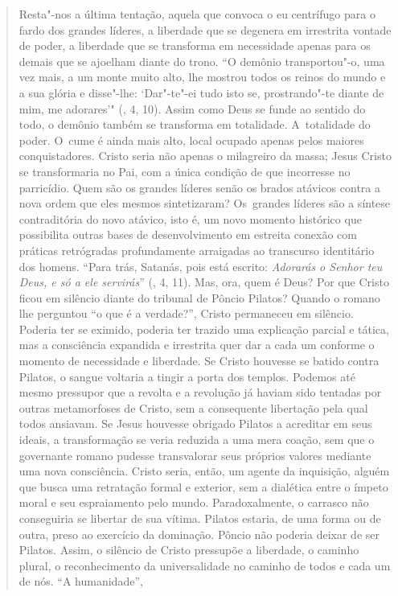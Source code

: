 {\begin{quote}
Resta"-nos a última tentação, aquela que convoca o eu centrífugo para o
fardo dos grandes líderes, a liberdade que se degenera em irrestrita
vontade de poder, a liberdade que se transforma em necessidade apenas
para os demais que se ajoelham diante do trono. ``O demônio
transportou"-o, uma vez mais, a um monte muito alto, lhe mostrou todos os
reinos do mundo e a sua glória e disse"-lhe: `Dar"-te"-ei tudo isto se,
prostrando"-te diante de mim, me adorares'" (, 4, 10). Assim como
Deus se funde ao sentido do todo, o demônio também se transforma em
totalidade. A~totalidade do poder. O~cume é ainda mais alto, local
ocupado apenas pelos maiores conquistadores. Cristo seria não apenas o
milagreiro da massa; Jesus Cristo se transformaria no Pai, com a única
condição de que incorresse no parricídio. Quem são os grandes líderes
senão os brados atávicos contra a nova ordem que eles mesmos
sintetizaram? Os~grandes líderes são a síntese contraditória do novo
atávico, isto é, um novo momento histórico que possibilita outras bases
de desenvolvimento em estreita conexão com práticas retrógradas
profundamente arraigadas ao transcurso identitário dos homens. ``Para
trás, Satanás, pois está escrito: \emph{Adorarás o Senhor teu Deus, e só
a ele servirás}'' (, 4, 11). Mas, ora, quem é Deus? Por que Cristo
ficou em silêncio diante do tribunal de Pôncio Pilatos? Quando o romano
lhe perguntou ``o que é a verdade?'', Cristo permaneceu em silêncio.
Poderia ter se eximido, poderia ter trazido uma explicação parcial e
tática, mas a consciência expandida e irrestrita quer dar a cada um
conforme o momento de necessidade e liberdade. Se Cristo houvesse se
batido contra Pilatos, o sangue voltaria a tingir a porta dos templos.
Podemos até mesmo pressupor que a revolta e a revolução já haviam sido
tentadas por outras metamorfoses de Cristo, sem a consequente libertação
pela qual todos ansiavam. Se Jesus houvesse obrigado Pilatos a acreditar
em seus ideais, a transformação se veria reduzida a uma mera coação, sem
que o governante romano pudesse transvalorar seus próprios valores
mediante uma nova consciência. Cristo seria, então, um agente da
inquisição, alguém que busca uma retratação formal e exterior, sem a
dialética entre o ímpeto moral e seu espraiamento pelo mundo.
Paradoxalmente, o carrasco não conseguiria se libertar de sua vítima.
Pilatos estaria, de uma forma ou de outra, preso ao exercício da
dominação. Pôncio não poderia deixar de ser Pilatos. Assim, o silêncio
de Cristo pressupõe a liberdade, o caminho plural, o reconhecimento da
universalidade no caminho de todos e cada um de nós. ``A humanidade'',

\end{quote}}
